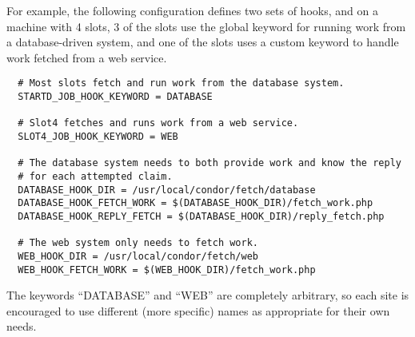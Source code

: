 For example, the following configuration defines two sets of hooks,
and on a machine with 4 slots, 3 of the slots use the global keyword
for running work from a database-driven system, and one of the slots
uses a custom keyword to handle work fetched from a web service.
\begin{verbatim}
  # Most slots fetch and run work from the database system.
  STARTD_JOB_HOOK_KEYWORD = DATABASE

  # Slot4 fetches and runs work from a web service.
  SLOT4_JOB_HOOK_KEYWORD = WEB

  # The database system needs to both provide work and know the reply
  # for each attempted claim.
  DATABASE_HOOK_DIR = /usr/local/condor/fetch/database
  DATABASE_HOOK_FETCH_WORK = $(DATABASE_HOOK_DIR)/fetch_work.php
  DATABASE_HOOK_REPLY_FETCH = $(DATABASE_HOOK_DIR)/reply_fetch.php

  # The web system only needs to fetch work.
  WEB_HOOK_DIR = /usr/local/condor/fetch/web
  WEB_HOOK_FETCH_WORK = $(WEB_HOOK_DIR)/fetch_work.php
\end{verbatim}

The keywords ``DATABASE'' and ``WEB'' are completely arbitrary, so
each site is encouraged to use different (more specific) names as
appropriate for their own needs.

